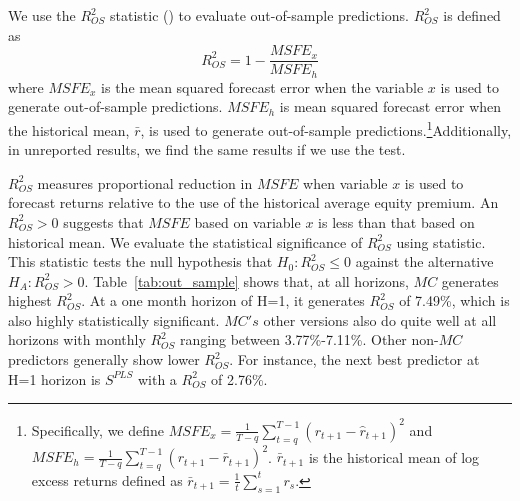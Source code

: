 We use the $R^{2}_{OS}$ statistic (\cite{Campbell2008}) to
evaluate out-of-sample predictions. $R^{2}_{OS}$ is defined as \vspace{-0.3cm}
\begin{equation} \label{eq:oos_r2}
R^{2}_{OS} = 1 - \frac{MSFE_{x}}{MSFE_{h}}
\end{equation}
where $MSFE_{x}$ is the mean squared forecast error when the
variable $x$ is used to generate out-of-sample predictions.
$MSFE_{h}$ is mean squared forecast error when the historical
mean, $\bar r$, is used to generate out-of-sample predictions.\footnote{Specifically, we define  $MSFE_{x} = \frac {1}{T-q}
\sum\limits_{t=q}^{T-1} (r_{t+1} - \hat r_{t+1})^{2}$ and
$MSFE_{h} = \frac {1}{T-q} \sum\limits_{t=q}^{T-1} (r_{t+1} - \bar
r_{t+1})^{2}$.
$\bar r_{t+1}$ is the historical mean of log excess returns
defined as $\bar r_{t+1} = \frac {1}{t} \sum\limits_{s=1}^{t}
r_{s}$.
}Additionally, in unreported results, we find the same results if we use the \cite{Diebold1995} test.

$R^{2}_{OS}$ measures proportional reduction in $MSFE$ when variable $x$ is used to forecast returns relative to the use of the historical average equity premium. An $R^{2}_{OS} > 0$ suggests that $MSFE$ based on variable $x$ is less than that based on historical mean. We evaluate the statistical significance of $R^{2}_{OS}$ using \cite{Clark2007} statistic. This statistic tests the null hypothesis that $H_{0}: R^{2}_{OS} \leq 0$ against the alternative $H_{A}: R^{2}_{OS} > 0$. Table~\ref{tab:out_sample} shows that, at all horizons, $MC$ generates highest $R^{2}_{OS}$. At a one month horizon of H=1, it generates $R^{2}_{OS}$ of 7.49\%, which is also highly statistically significant. $MC's$ other versions also do quite well at all horizons with monthly $R^{2}_{OS}$ ranging between 3.77\%-7.11\%. Other non-$MC$ predictors generally show lower $R^{2}_{OS}$. For instance, the next best predictor at H=1 horizon is $S^{PLS}$ with a $R^{2}_{OS}$ of 2.76\%.
